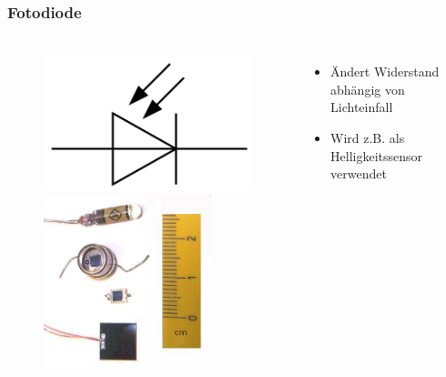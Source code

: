 \begin{frame}
    \frametitle{Fotodiode}
    \begin{columns}[c]
        \column[c]{5cm}
        \begin{center}
	\begin{figure}
            \includegraphics[width=.8\textwidth, height=.2\textheight, keepaspectratio]{e12/Symbol_Photodiode.png}\\
            \includegraphics[width=0.8\textwidth,height=.4\textheight, keepaspectratio]{e12/Fotodio.jpg}
	\end{figure}
        \end{center}
        \column{5cm}
    \begin{itemize}
			\item Ändert Widerstand abhängig von Lichteinfall 
			\item Wird z.B. als Helligkeitssensor verwendet
    \end{itemize}
    \end{columns}
\end{frame}

